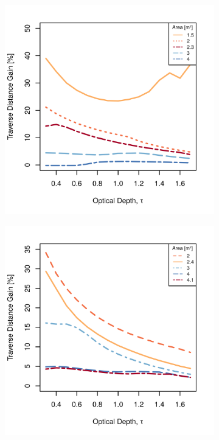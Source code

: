 \documentclass[twocolumn,letterpaper]{IEEEAerospaceCLS}  %
\newlength{\subfigureWidth}
\newlength{\graphicsHeight}
\begin{document}
\begin{figure}[h]
\captionsetup[subfigure]{justification=centering}
  \centering
  \setlength{\subfigureWidth}{0.24\textwidth}
  \setlength{\graphicsHeight}{40mm}
    \begin{subfigure}[t]{\subfigureWidth}
      \centering
      \includegraphics[height=\graphicsHeight]{figures/plots/ianichaos-75w-traverse-gains-for-different-solar-cell-coverage-areas.png}
    \label{fig:plot:sub:ismenius-chaos-flat-traverse-gains-for-different-sa-area}
    \end{subfigure}\hfill
    \begin{subfigure}[t]{\subfigureWidth}
      \centering
      \includegraphics[height=\graphicsHeight]{figures/plots/ismeniuscavus-75w-traverse-gains-for-different-solar-cell-coverage-areas.png}

\end{subfigure}
\end{figure}
\end{document}
